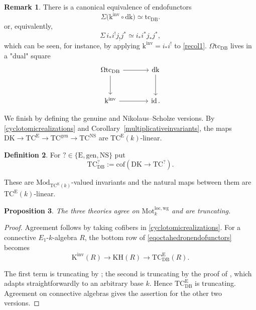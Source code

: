 \documentclass{amsart}
\theoremstyle{plain}
\newtheorem{prop}{Proposition}[section]
\theoremstyle{definition}
\newtheorem{defi}[prop]{Definition}
\newtheorem{remark}[prop]{Remark}
\newcommand{\Motlocwg}{\mathrm{Mot}^{\mathrm{loc},\mathrm{wg}}}
\newcommand{\TC}{\mathrm{TC}}
\newcommand{\cof}{\mathrm{cof}}
\newcommand{\K}{\mathrm{K}}
\newcommand{\KH}{\mathrm{KH}}
\newcommand{\DK}{\mathrm{DK}}
\newcommand{\dk}{\mathrm{dk}}
\newcommand{\tc}{\mathrm{tc}}
\newcommand{\kinv}{\mathrm{k}^{\mathrm{inv}}}
\newcommand{\Mod}{\mathrm{Mod}}
\DeclareMathOperator{\id}{id}
\newcommand{\DB}{\mathrm{DB}}
\newcommand{\NS}{\mathrm{NS}}
\newcommand{\gen}{\mathrm{gen}}
\begin{document}
\begin{remark}\label{dualDB}
There is a canonical equivalence of endofunctors
\begin{equation}\label{eqdualdescription}
\Sigma\bigl(\kinv\circ \dk\bigr)\simeq \tc_{\DB}.
\end{equation}
or, equivalently,
\[
\Sigma\,i_*i^!j_!j^*\simeq i_*i^*j_*j^*,
\]
which can be seen, for instance, by applying $\kinv=i_*i^!$ to \eqref{recol1}.
$\Omega \tc_{\DB}$ lives in a "dual" square
\begin{equation}\label{eqdualsquare}
\begin{tikzcd}[column sep=large,row sep=large]
\Omega \tc_{\DB} \arrow[r] \arrow[d]
  & \dk \arrow[d] \\
\kinv \arrow[r]
  & \id.
\end{tikzcd}
\end{equation}
\end{remark}



We finish by defining the genuine and Nikolaus--Scholze versions.
By \eqref{cyclotomicrealizations} and Corollary~\ref{multiplicativeinvariants}, the maps
$\DK\to \TC^{\mathrm{E}}\to \TC^{\gen}\to \TC^{\NS}$ are $\TC^{\mathrm{E}}(k)$-linear.

\begin{defi}
For $?\in\{\mathrm{E},\gen,\NS\}$ put
\[
\TC^?_{\DB}:=\cof(\DK\longrightarrow \TC^?).
\]
\end{defi}

These are $\Mod_{\TC^{\mathrm{E}}(k)}$-valued invariants and the natural maps between them are $\TC^{\mathrm{E}}(k)$-linear.

\begin{prop}\label{TCDBtruncating}
The three theories agree on $\Motlocwg_k$ and are truncating.
\end{prop}

\begin{proof}
Agreement follows by taking cofibers in
\eqref{cyclotomicrealizations}. For a connective
$E_1$-$k$-algebra $R$, the bottom row of
\eqref{eqoctahedronendofunctors} becomes
\[
\K^{\mathrm{inv}}(R)\longrightarrow \KH(R)
\longrightarrow \TC^{\mathrm{E}}_{\DB}(R).
\]

The first term is truncating by
\cite[Theorem 7.0.0.2]{DGM13}; the second is truncating by the proof of \cite[Proposition 3.14]{LT19}, which adapts straightforwardly to an arbitrary base $k$.
Hence $\TC^{\mathrm{E}}_{\DB}$ is truncating. Agreement on connective algebras gives the assertion for the other two versions.


\end{proof}
\end{document}
